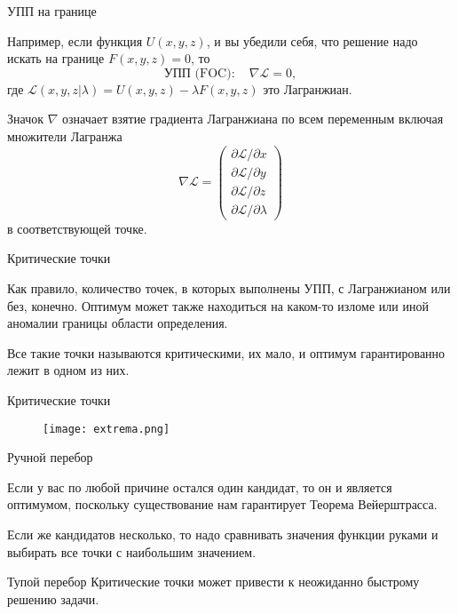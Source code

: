 \documentclass{beamer}
\begin{document}
\begin{frame}{УПП на границе}

Например, если функция $U(x, y, z)$, и вы убедили себя, что решение надо искать на границе $F(x,y,z) = 0$, то
$$\text{УПП (FOC)}: \quad  \nabla \mathcal{L} = 0, $$ 
где $\mathcal{L}(x,y,z|\lambda) = U(x, y, z) - \lambda F(x,y,z)$ это \alert{Лагранжиан}.

Значок $\nabla$ означает взятие градиента Лагранжиана по всем переменным включая множители Лагранжа $$ \nabla \mathcal{L} = \begin{pmatrix} \partial \mathcal{L}/\partial x \\ \partial \mathcal{L}/\partial y \\ \partial \mathcal{L}/\partial z \\ \partial \mathcal{L}/\partial \lambda \end{pmatrix}$$
в соответствующей точке.

\end{frame}


\begin{frame}{Критические точки}

Как правило, количество точек, в которых выполнены УПП, с Лагранжианом или без,  конечно. Оптимум может также находиться на каком-то изломе или иной аномалии границы области определения.

Все такие точки называются \alert{критическими}, их мало, и оптимум гарантированно лежит в одном из них. 

\end{frame}

\begin{frame}{Критические точки}

\begin{figure}[hbt]
\centering
\texttt{[image: extrema.png]}
\end{figure}

\end{frame}

\begin{frame}{Ручной перебор}

Если у вас по любой причине остался один кандидат, то он и является оптимумом, поскольку существование нам гарантирует Теорема Вейерштрасса. 

Если же кандидатов несколько, то надо сравнивать значения функции руками и выбирать все точки с наибольшим значением. 

Тупой перебор Критические точки может привести к неожиданно быстрому решению задачи.

\end{frame}
\end{document}
